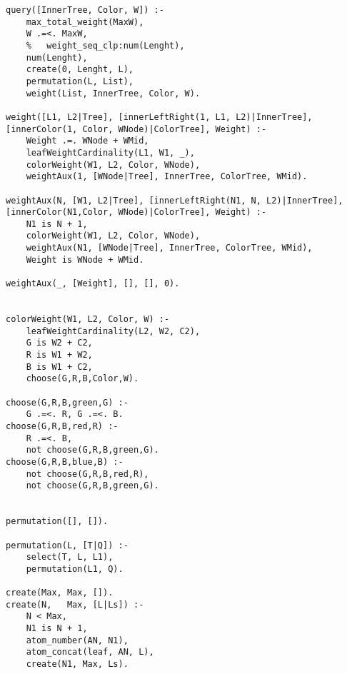 \documentclass[]{article}
\begin{document}
\begin{lstlisting}
query([InnerTree, Color, W]) :-
	max_total_weight(MaxW),
	W .=<. MaxW,
	%	weight_seq_clp:num(Lenght),
	num(Lenght),
	create(0, Lenght, L),
	permutation(L, List),
	weight(List, InnerTree, Color, W).

weight([L1, L2|Tree], [innerLeftRight(1, L1, L2)|InnerTree], [innerColor(1, Color, WNode)|ColorTree], Weight) :-
	Weight .=. WNode + WMid,
	leafWeightCardinality(L1, W1, _),
	colorWeight(W1, L2, Color, WNode),
	weightAux(1, [WNode|Tree], InnerTree, ColorTree, WMid).

weightAux(N, [W1, L2|Tree], [innerLeftRight(N1, N, L2)|InnerTree], [innerColor(N1,Color, WNode)|ColorTree], Weight) :-
	N1 is N + 1,
	colorWeight(W1, L2, Color, WNode),
	weightAux(N1, [WNode|Tree], InnerTree, ColorTree, WMid),
	Weight is WNode + WMid.

weightAux(_, [Weight], [], [], 0).


colorWeight(W1, L2, Color, W) :-
	leafWeightCardinality(L2, W2, C2),
	G is W2 + C2,
	R is W1 + W2,
	B is W1 + C2,
	choose(G,R,B,Color,W).

choose(G,R,B,green,G) :-
	G .=<. R, G .=<. B.
choose(G,R,B,red,R) :-
	R .=<. B,
	not choose(G,R,B,green,G).
choose(G,R,B,blue,B) :-
	not choose(G,R,B,red,R),
	not choose(G,R,B,green,G).


permutation([], []).

permutation(L, [T|Q]) :-
	select(T, L, L1),
	permutation(L1, Q).

create(Max, Max, []).
create(N,   Max, [L|Ls]) :-
	N < Max,
	N1 is N + 1,
	atom_number(AN, N1),
	atom_concat(leaf, AN, L),
	create(N1, Max, Ls).
 \end{lstlisting}
\end{document}
